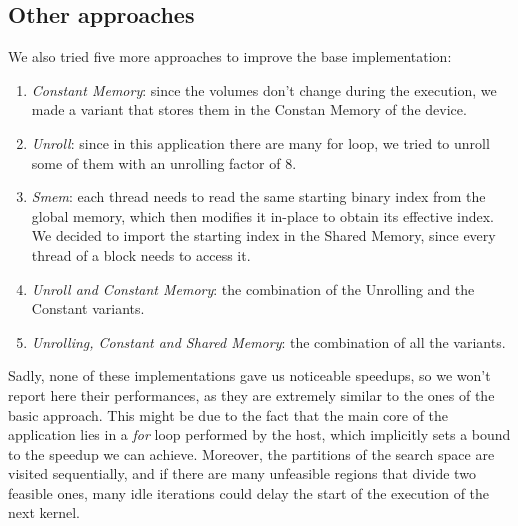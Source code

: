 \documentclass[12pt]{extarticle}
\begin{document}
\subsection{Other approaches}
We also tried five more approaches to improve the base implementation:
\begin{enumerate}
    \item \emph{Constant Memory}: since the volumes don't change during the execution, we made a variant that stores them in the Constan Memory of the device.
    \item \emph{Unroll}: since in this application there are many for loop, we tried to unroll some of them with an unrolling factor of 8.
    \item \emph{Smem}: each thread needs to read the same starting binary index from the global memory, which then modifies it in-place to obtain its effective index. We decided to import the starting index in the Shared Memory, since every thread of a block needs to access it.
    \item \emph{Unroll and Constant Memory}: the combination of the Unrolling and the Constant variants.
    \item \emph{Unrolling, Constant and Shared Memory}: the combination of all the variants.
\end{enumerate}
Sadly, none of these implementations gave us noticeable speedups, so we won't report here their performances, as they are extremely similar to the ones of the basic approach. This might be due to the fact that the main core of the application lies in a \emph{for} loop performed by the host, which implicitly sets a bound to the speedup we can achieve. Moreover, the partitions of the search space are visited sequentially, and if there are many unfeasible regions that divide two feasible ones, many idle iterations could delay the start of the execution of the next kernel. 
\end{document}
